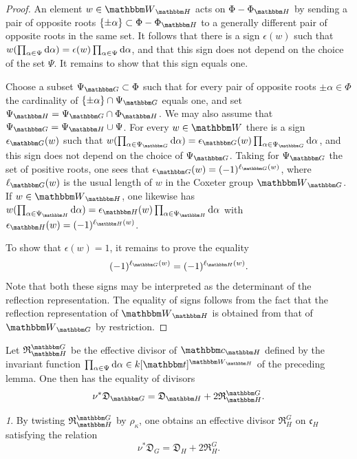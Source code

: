 \documentclass[12pt,english]{smfart}
\numberwithin{equation}{subsection}
\theoremstyle{remark}
\newtheorem{numero}[equation]{}
\newcommand\frakc{{\mathfrak c}}
\newcommand\HH{{\mathbbm H}}
\newcommand\bbH{{\mathbbm H}}
\newcommand\bbW{{\mathbbm W}}
\newcommand\bbG{{\mathbbm G}}
\newcommand\bbt{{\mathbbm t}}
\newcommand\bbc{{\mathbbm c}}
\newcommand\resultant{\mathfrak R}
\newcommand\discrim{\mathfrak D}
\begin{document}
\begin{proof}
An element $w\in\bbW_\bbH$ acts on $\Phi-\Phi_\bbH$ by sending a pair of opposite roots $\{\pm\alpha\}\subset\Phi-\Phi_\bbH$ to a generally different pair of opposite roots in the same set. It follows that there is a sign $\epsilon(w)$ such that $w(\prod_{\alpha\in\Psi}{\rm d}\alpha)=\epsilon(w)\prod_{\alpha\in\Psi}{\rm d}\alpha$, and that this sign does not depend on the choice of the set $\Psi$. It remains to show that this sign equals one.

Choose a subset $\Psi_\bbG\subset\Phi$ such that for every pair of opposite roots $\pm\alpha\in\Phi$ the cardinality of $\{\pm\alpha\}\cap\Psi_\bbG$ equals one, and set $\Psi_\bbH=\Psi_\bbG\cap\Phi_\bbH$. We may also assume that $\Psi_\bbG=\Psi_\bbH\cup\Psi$. For every $w\in\bbW$ there is a sign $\epsilon_\bbG(w)$ such that $w(\prod_{\alpha\in\Psi_\bbG}{\rm d}\alpha)=\epsilon_\bbG(w)\prod_{\alpha\in\Psi_\bbG}{\rm d}\alpha$, and this sign does not depend on the choice of $\Psi_\bbG$. Taking for $\Psi_\bbG$ the set of positive roots, one sees that $\epsilon_\bbG(w)=(-1)^{\ell_\bbG(w)}$, where $\ell_\bbG(w)$ is the usual length of $w$ in the Coxeter group $\bbW_\bbG$. If $w\in\bbW_\bbH$, one likewise has $w(\prod_{\alpha\in\Psi_\bbH}{\rm d}\alpha)=\epsilon_\bbH(w)\prod_{\alpha\in\Psi_\bbH}{\rm d}\alpha$ with $\epsilon_\bbH(w)=(-1)^{\ell_\bbH(w)}$.

To show that $\epsilon(w)=1$, it remains to prove the equality
$$(-1)^{\ell_\bbG(w)}=(-1)^{\ell_\bbH(w)}.$$
Note that both these signs may be interpreted as the determinant of the reflection representation. The equality of signs follows from the fact that the reflection representation of $\bbW_\bbH$ is obtained from that of $\bbW_\bbG$ by restriction.
\end{proof}

Let $\resultant_\bbH^\bbG$ be the effective divisor of $\bbc_\HH$ defined by the invariant function $\prod_{\alpha\in\Psi}{\rm d}\alpha\in k[\bbt]^{\bbW_\bbH}$ of the preceding lemma. One then has the equality of divisors
$$\nu^*\discrim_\bbG=\discrim_\bbH+2\resultant_\bbH^\bbG.$$

\begin{numero}\label{discrimnant resultant}
By twisting $\resultant_\bbH^\bbG$ by $\rho_{\kappa}$, one obtains an effective divisor $\resultant_H^G$ on $\frakc_H$ satisfying the relation
$$
\nu^* \discrim_G=\discrim_H+2 \resultant_H^G.
$$
\end{numero}
\end{document}
